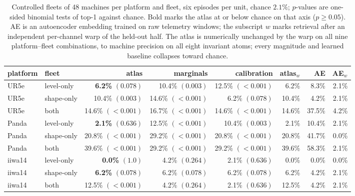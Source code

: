\documentclass[11pt]{article}
\begin{document}
\begin{table}[t]
\centering
\small
\begin{tabular}{llrrrrrr}
\toprule
platform & fleet & atlas & marginals & calibration & atlas$_{w}$ & AE & AE$_{w}$ \\
\midrule
UR5e   & level-only & \textbf{6.2\%} $(0.078)$ & 10.4\% $(0.003)$ & 12.5\% $(<0.001)$ & 6.2\% & 8.3\% & 2.1\% \\
UR5e   & shape-only & 10.4\% $(0.003)$ & 14.6\% $(<0.001)$ & 6.2\% $(0.078)$ & 10.4\% & 4.2\% & 2.1\% \\
UR5e   & both       & 14.6\% $(<0.001)$ & 16.7\% $(<0.001)$ & 14.6\% $(<0.001)$ & 14.6\% & 37.5\% & 4.2\% \\
Panda  & level-only & \textbf{2.1\%} $(0.636)$ & 12.5\% $(<0.001)$ & 10.4\% $(0.003)$ & 2.1\% & 10.4\% & 2.1\% \\
Panda  & shape-only & 20.8\% $(<0.001)$ & 29.2\% $(<0.001)$ & 20.8\% $(<0.001)$ & 20.8\% & 41.7\% & 0.0\% \\
Panda  & both       & 39.6\% $(<0.001)$ & 29.2\% $(<0.001)$ & 29.2\% $(<0.001)$ & 39.6\% & 58.3\% & 2.1\% \\
iiwa14 & level-only & \textbf{0.0\%} $(1.0)$ & 4.2\% $(0.264)$ & 2.1\% $(0.636)$ & 0.0\% & 0.0\% & 0.0\% \\
iiwa14 & shape-only & \textbf{6.2\%} $(0.078)$ & 6.2\% $(0.078)$ & 6.2\% $(0.078)$ & 6.2\% & 4.2\% & 2.1\% \\
iiwa14 & both       & 12.5\% $(<0.001)$ & 4.2\% $(0.264)$ & 2.1\% $(0.636)$ & 12.5\% & 4.2\% & 2.1\% \\
\bottomrule
\end{tabular}
\caption{Controlled fleets of 48 machines per platform and fleet, six
episodes per unit, chance $2.1\%$; $p$-values are one-sided binomial tests of
top-1 against chance. Bold marks the atlas at or below chance on that axis
($p \geq 0.05$). AE is an autoencoder embedding trained on raw telemetry
windows; the subscript $w$ marks retrieval after an independent per-channel
warp of the held-out half. The atlas is numerically unchanged by the warp on
all nine platform--fleet combinations, to machine precision on all eight
invariant atoms; every magnitude and learned baseline collapses toward
chance.}
\label{tab:fleetctl}
\end{table}
\end{document}
